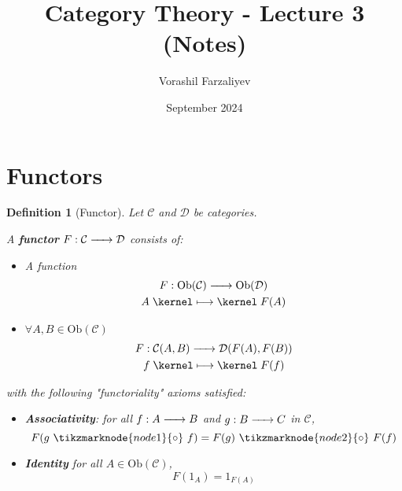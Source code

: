 \documentclass{article}
\title{Category Theory - Lecture 3 (Notes)}
\author{Vorashil Farzaliyev}
\date{September 2024}
\newtheorem{definition}{Definition}[section]
\renewcommand{\to}{\xrightarrow{\hspace{0.5cm}}}  %
\renewcommand{\mapsto}{\mathrel{\kernel\longmapsto\kernel}}  %
\begin{document}
    \maketitle


    \section{Functors}

    \begin{definition}[Functor]
        Let $\mathcal{C}$ and $\mathcal{D}$ be categories.
        \\
        \vspace{0.05in}

        A \textbf{functor} $F: \mathcal{C} \to \mathcal{D}$ consists of:

        \begin{itemize}
            \item A function
            \begin{gather*}
                F: \text{Ob}(\mathcal{C}) \to \text{Ob}(\mathcal{D})\\
                A \mapsto F(A)\\
            \end{gather*}
            \item $\forall A, B \in \text{Ob}(\mathcal{C})$
            \begin{gather*}
                F: \mathcal{C}(A, B) \to \mathcal{D}(F(A), F(B))\\
                f \mapsto F(f)\\
            \end{gather*}
        \end{itemize}
        with the following "functoriality" axioms satisfied:
        \begin{itemize}
            \item \textbf{Associativity}: for all $f: A \to B$ and $g: B \to C$ in $\mathcal{C}$,
            \begin{equation*}
                F(g \ \tikzmarknode{node1}{  \circ } \  f) = F(g) \ \tikzmarknode{node2}{ \circ } \ F(f)
            \end{equation*}
            \vspace{0.2in}
            \item \textbf{Identity} for all $A \in \text{Ob}(\mathcal{C})$,
            \[
                F(1_A) = 1_{F(A)}
            \]
        \end{itemize}
    \end{definition}
\end{document}
